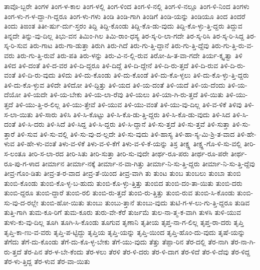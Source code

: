 {ತಾವೊ-ಬ್ಬರೇ
ತಿಂಗಳ
ತಿಂಗ-ಳ-ಕಾಲ
ತಿಂಗ-ಳಲ್ಲಿ
ತಿಂಗ-ಳಿಂದ
ತಿಂಗ-ಳಿ-ನಲ್ಲಿ
ತಿಂಗ-ಳಿ-ನಲ್ಲೂ
ತಿಂಗ-ಳಿ-ನಿಂದ
ತಿಂಗಳು
ತಿಂಗ-ಳು-ಗ-ಳ-ದ್ದಾ-ಗಿ-ದ್ದರೂ
ತಿಂಗ-ಳು-ಗಳು
ತಿಂಡಿ
ತಿಂಡಿ-ಗಾಗಿ
ತಿಂಡಿಗೆ
ತಿಂಡಿ-ಯನ್ನು
ತಿಂಡಿಯೂ
ತಿಂದ
ತಿಂದರೆ
ತಿಂದು
ತಿಙಂತ
ತಿತೀ-ರ್ಷು-ರ್ದು-ಸ್ತರಂ
ತಿದ್ದಿ
ತಿದ್ದಿ-ಕೊಂಡು
ತಿದ್ದಿ-ಕೊ-ಡು-ವುದು
ತಿದ್ದಿ-ಕೊ-ಳ್ಳು-ತ್ತಿ-ದ್ದರು
ತಿದ್ದುವ
ತಿನ್ನದೇ
ತಿನ್ನು-ವು-ದಿಲ್ಲ
ತಿಭು-ವನ
ತಿಮಿಂ-ಗಿಲ
ತಿಮಿ-ರಾಂ-ಧಸ್ಯ
ತಿರ-ಸ್ಕ-ರಿ-ಲಾ-ಗದೇ
ತಿರ-ಸ್ಕ-ರಿಸಿ
ತಿರ-ಸ್ಕ-ರಿ-ಸಿದ್ದ
ತಿರ-ಸ್ಕ-ರಿ-ಸುವ
ತಿರು-ಗಾಟ
ತಿರು-ಗಾ-ಡುತ್ತಾ
ತಿರುಗಿ
ತಿರು-ಗಿದೆ
ತಿರು-ಗು-ತ್ತಿ-ದ್ದಾನೆ
ತಿರು-ಗು-ತ್ತಿ-ದ್ದೆವು
ತಿರು-ಗು-ತ್ತಿ-ರು-ವ-ವರು
ತಿರು-ಗು-ತ್ತಿ-ರುವೆ
ತಿರು-ಪತಿ
ತಿರು-ಳನ್ನು
ತಿರು-ವಿ-ನ-ಲ್ಲಿ-ರುವ
ತಿರೋ-ಹಿ-ತ-ವಾ-ಗದೇ
ತಿರ್ಯ-ಕ್ಕೃತ್ವಾ
ತಿಳಿ
ತಿಳಿದ
ತಿಳಿ-ದಂತೆ
ತಿಳಿ-ದ-ವರ
ತಿಳಿ-ದಿ-ದ್ದರೂ
ತಿಳಿ-ದಿದ್ದೆ
ತಿಳಿ-ದಿ-ದ್ದೇನೆ
ತಿಳಿ-ದಿ-ರು-ತ್ತದೆ
ತಿಳಿ-ದಿ-ರುವ
ತಿಳಿ-ದಿ-ರು-ವಂತೆ
ತಿಳಿ-ದಿ-ರು-ವುದು
ತಿಳಿದು
ತಿಳಿ-ದು-ಕೊಂಡು
ತಿಳಿ-ದು-ಕೊಂಡೆ
ತಿಳಿ-ದು-ಕೊ-ಳ್ಳಲು
ತಿಳಿ-ದು-ಕೊ-ಳ್ಳು-ತ್ತಿ-ದ್ದರು
ತಿಳಿ-ದು-ಕೊ-ಳ್ಳುವ
ತಿಳಿದೇ
ತಿಳಿದೋ
ತಿಳಿ-ದ್ದಿತ್ತು
ತಿಳಿ-ಯದ
ತಿಳಿ-ಯ-ದಂತೆ
ತಿಳಿ-ಯದೆ
ತಿಳಿ-ಯ-ದೆಂದು
ತಿಳಿ-ಯ-ದೆಯೋ
ತಿಳಿ-ಯದೇ
ತಿಳಿ-ಯ-ಬೇಕು
ತಿಳಿ-ಯ-ಲಾ-ರೆವು
ತಿಳಿ-ಯಲು
ತಿಳಿ-ಯಾ-ಗಿ-ರು-ತ್ತದೆ
ತಿಳಿ-ಯಿತು
ತಿಳಿ-ಯು-ತ್ತದೆ
ತಿಳಿ-ಯು-ತ್ತಿ-ರ-ಲಿಲ್ಲ
ತಿಳಿ-ಯು-ತ್ತೇವೆ
ತಿಳಿ-ಯುವ
ತಿಳಿ-ಯು-ವಂತೆ
ತಿಳಿ-ಯು-ವು-ದಿಲ್ಲ
ತಿಳಿ-ವ-ಳಿಕೆ
ತಿಳಿವು
ತಿಳಿ-ಸ-ಲಾ-ಯಿತು
ತಿಳಿ-ಸಾರು
ತಿಳಿಸಿ
ತಿಳಿ-ಸಿ-ಕೊಟ್ಟು
ತಿಳಿ-ಸಿ-ಕೊ-ಡು-ತ್ತಿ-ದ್ದರು
ತಿಳಿ-ಸಿ-ಕೊ-ಡು-ವುದು
ತಿಳಿ-ಸಿದ
ತಿಳಿ-ಸಿ-ದಂತೆ
ತಿಳಿ-ಸಿ-ದರು
ತಿಳಿ-ಸಿದೆ
ತಿಳಿ-ಸಿದ್ದ
ತಿಳಿ-ಸಿ-ದ್ದರು
ತಿಳಿ-ಸಿ-ದ್ದಾನೆ
ತಿಳಿ-ಸು-ತ್ತದೆ
ತಿಳಿ-ಸು-ತ್ತವೆ
ತಿಳಿ-ಸುತ್ತಾ
ತಿಳಿ-ಸು-ತ್ತಾರೆ
ತಿಳಿ-ಸುವ
ತಿಳಿ-ಸು-ವಲ್ಲಿ
ತಿಳಿ-ಸು-ವು-ದ-ಲ್ಲದೇ
ತಿಳಿ-ಸು-ವುದು
ತಿಳಿ-ಹಾಸ್ಯ
ತಿಳಿ-ಹಾ-ಸ್ಯ-ಮಿ-ಶ್ರಿ-ತ-ವಾದ
ತಿಳಿ-ಹೇ-ಳುವ
ತಿಳಿ-ಹೇ-ಳು-ವಂತೆ
ತಿಳು-ವ-ಳಿಕೆ
ತಿಳು-ವ-ಳಿ-ಕೆಗೆ
ತಿಳು-ವ-ಳಿ-ಕೆ-ಯನ್ನು
ತಿಸ್ರ
ತೀಕ್ಷ್ಣ
ತೀಕ್ಷ್ಣ-ಗೊ-ಳಿ-ಸು-ವಲ್ಲಿ
ತೀರಿ-ಸ-ಲಂತೂ
ತೀರಿ-ಸ-ಲಾ-ರದ
ತೀರಿ-ಸಿತು
ತೀರಿ-ಸುತ್ತಾ
ತೀರಿ-ಸು-ವುದೇ
ತೀರ್ಥ-ರೂ-ಪರು
ತೀರ್ಥ-ರೂ-ಪರೇ
ತೀರ್ಥ-ರೂ-ಪು-ಗ-ಳಾದ
ತೀರ್ಮಾನ
ತೀರ್ಮಾ-ನಕ್ಕೆ
ತೀರ್ಮಾ-ನ-ವಾ-ಗಿತ್ತು
ತೀರ್ಮಾ-ನಿ-ಸು-ತ್ತಿ-ದ್ದರು
ತೀರ್ಮಾ-ನಿ-ಸು-ತ್ತಿ-ದ್ದೆವು
ತೀವ್ರ-ಗೊಂ-ಡಿತು
ತೀವ್ರ-ತ-ರ-ವಾದ
ತೀವ್ರ-ತೆ-ಯಿಂದ
ತೀವ್ರ-ವಾಗಿ
ತು
ತುಂಟ
ತುಂಬ
ತುಂಬಲು
ತುಂಬಾ
ತುಂಬಿ
ತುಂಬಿ-ಕೊಂಡು
ತುಂಬಿ-ಕೊ-ಳ್ಳ-ಬ-ಹುದು
ತುಂಬಿ-ಕೊ-ಳ್ಳು-ತ್ತಿತ್ತು
ತುಂಬಿದ
ತುಂಬಿ-ದಂ-ತಾ-ಯಿತು
ತುಂಬಿ-ದರು
ತುಂಬಿ-ದ್ದರೂ
ತುಂಬಿ-ದ್ದಾರೆ
ತುಂಬಿ-ರಲಿ
ತುಂಬಿ-ರು-ತ್ತದೆ
ತುಂಬಿ-ರು-ತ್ತಿತ್ತು
ತುಂಬಿ-ರುವ
ತುಂಬಿ-ಸಿ-ಕೊಂಡು
ತುಂಬಿ-ಸು-ವು-ದ-ರಲ್ಲೇ
ತುಂಬಿ-ಹೋ-ಯಿತು
ತುಂಬು
ತುಂಬು-ತ್ತಾನೆ
ತುಂಬು-ವುದು
ತುಟಿ-ಗ-ಳ-ಲು-ಗು-ತ್ತಿ-ದ್ದರೂ
ತುಡಿವ
ತುತ್ತಿ-ಗಾಗಿ
ತುಮ-ಕೂ-ರಿಗೆ
ತುಮ-ಕೂರು
ತುರು-ವೇ-ಕೆರೆ
ತುರ್ಜಮೆ
ತುಲ-ನಾ-ತ್ಮ-ಕ-ವಾಗಿ
ತುಳಸಿ
ತುಳಿ-ಯುವ
ತುಳು-ಕು-ವು-ದಿಲ್ಲ
ತೂಗಿ
ತೂಗಿ-ಸಿ-ಕೊಂಡು
ತೂಗುವ
ತೃಣಾನಿ
ತೃತೀಯ
ತೃಪ್ತ-ನಾ-ಗ-ಲಿಲ್ಲ
ತೃಪ್ತ-ರಾ-ದರು
ತೃಪ್ತಿ
ತೃಪ್ತಿ-ಕಾ-ಣು-ವ-ವರು
ತೃಪ್ತಿ-ಪ-ಟ್ಟಿದ್ದು
ತೃಪ್ತಿಯ
ತೃಪ್ತಿ-ಯನ್ನು
ತೃಪ್ತಿ-ಯಿಂದ
ತೃಪ್ತಿ-ಹೊಂ-ದು-ವುದು
ತೃಷೆ-ಯನ್ನು
ತೆಗೆದು
ತೆಗೆ-ದು-ಕೊಂಡು
ತೆಗೆ-ದು-ಕೊ-ಳ್ಳ-ಬೇಕು
ತೆಗೆ-ಯು-ವುದು
ತೆತ್ತು
ತೆಪ್ಪಾ-ರಿನ
ತೆರ-ದಲ್ಲಿ
ತೆರ-ನಾಗಿ
ತೆರ-ನಾ-ಗಿ-ರು-ತ್ತದೆ
ತೆರ-ಪಿನ
ತೆರ-ಳ-ಬೇ-ಕೆಂದು
ತೆರ-ಳಲು
ತೆರಳಿ
ತೆರ-ಳಿ-ದರು
ತೆರ-ಳಿ-ದಾಗ
ತೆರ-ಳಿದೆ
ತೆರ-ಳಿ-ದೆವು
ತೆರ-ಳಿದ್ದ
ತೆರ-ಳು-ತ್ತಿದ್ದ
ತೆರ-ಳುವ
ತೆರ-ವಾ-ಯಿತು
}
